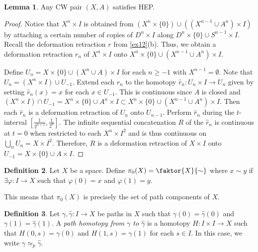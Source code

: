 \documentclass[10pt,letterpaper,cm]{nupset}
\theoremstyle{definition}
\newtheorem{definition}{Definition}[subsection]
\theoremstyle{theorem}
\newtheorem{lemma}[definition]{Lemma}
\theoremstyle{remark}
\newcommand{\1}{\mathbb{1}}
\newcommand{\0}{\vec 0}
\begin{document}
\begin{lemma}
Any CW pair $(X,A)$ satisfies HEP.
\end{lemma}
\begin{proof}
Notice that $X^n \times I$ is obtained from $\left(X^n \times \{0\}\right) \cup \left(\left(X^{n-1} \cup A^n\right) \times I\right)$ by attaching a certain number of copies of $D^n \times I$ along $D^n \times \{0\} \cup S^{n-1} \times I$. Recall the deformation retraction $r$ from  \cref{ex12}(b). Thus, we obtain a deformation retraction $r_n$ of $X^n \times I$ onto $X^n \times \{0\} \cup \left(X^{n-1} \cup A^n\right) \times I$.

Define $U_n = X\times \{0\} \cup (X^n \cup A) \times I$ for each $n\geq -1$ with $X^{n-1} = \emptyset$. Note that $U_n = \left(X^n \times I\right) \cup U_{-1}$. Extend each $r_n$ to the homotopy $\hat{r}_n : U_n \times I \to U_n$ given by setting $\hat{r}_n(x) = x$ for each $x\in U_{-1}$. This is continuous since $A$ is closed and $\left(X^n \times I\right) \cap U_{-1} = X^n \times \{0\} \cup A^n \times I \subset X^n \times \{0\} \cup \left(X^{n-1} \cup A^n\right) \times I$. Then each $\hat{r}_n$ is a deformation retraction of $U_n$ onto $U_{n-1}$.  Perform $\hat{r}_n$ during the $t$-interval $\left[\frac{1}{2^{n+1}}, \frac{1}{2^n}\right]$.  The infinite sequential concatenation $R$ of the $\hat{r}_n$ is continuous at $t=0$ when restricted to each $X^n \times I^2$  and is thus continuous on $\bigcup_n U_n = X \times I^2$. Therefore, $R$ is a deformation retraction of $X\times I$ onto $U_{-1} = X\times \{0\} \cup A\times I$.
\end{proof}

\begin{definition}
Let $X$ be a space. Define $\pi_0(X) = \faktor{X}{\sim} $ where $x\sim y$ if $\exists \varphi: I \to X$ such that $\varphi(0)=x$ and $\varphi(1) = y$.
\end{definition}

This means that $\pi_0(X)$ is precisely the set of path components of $X$.

\begin{definition}
Let $\gamma, \hat{\gamma}: I \to X$ be paths in $X$ such that $\gamma(0) = \hat{\gamma}(0)$ and $\gamma(1) = \hat{\gamma}(1)$.  A \textit{path homotopy from $\gamma$ to $\hat{\gamma}$} is a homotopy $H: I \times I \to X$ such that $H(0,s) = \gamma(0)$ and $H(1,s) = \gamma(1)$ for each $s\in I$. In this case, we write $\gamma \simeq_p \hat{\gamma}$.
\end{definition}
\end{document}
